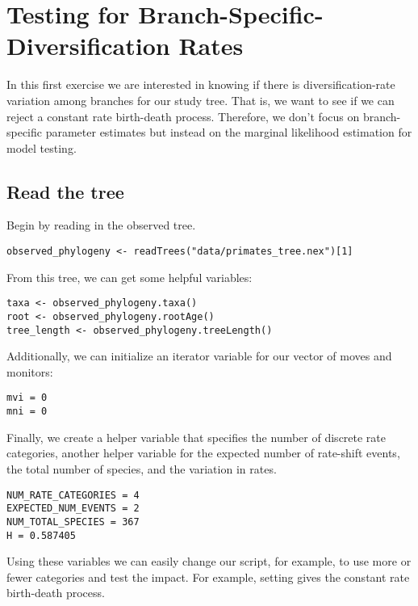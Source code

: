 \bigskip
\section{Testing for Branch-Specific-Diversification Rates}

In this first exercise we are interested in knowing if there is diversification-rate variation among branches for our study tree.
That is, we want to see if we can reject a constant rate birth-death process.
Therefore, we don't focus on branch-specific parameter estimates but instead on the marginal likelihood estimation for model testing.



\subsection{Read the tree}

Begin by reading in the observed tree.

{\tt \begin{snugshade*}
\begin{lstlisting}
observed_phylogeny <- readTrees("data/primates_tree.nex")[1]
\end{lstlisting}
\end{snugshade*}}

From this tree, we can get some helpful variables:
{\tt \begin{snugshade*}
\begin{lstlisting}
taxa <- observed_phylogeny.taxa()
root <- observed_phylogeny.rootAge()
tree_length <- observed_phylogeny.treeLength()
\end{lstlisting}
\end{snugshade*}}

Additionally, we can initialize an iterator variable for our vector of moves and monitors:
{\tt \begin{snugshade*}
\begin{lstlisting}
mvi = 0
mni = 0
\end{lstlisting}
\end{snugshade*}}

Finally, we create a helper variable that specifies the number of discrete rate categories, another helper variable for the expected number of rate-shift events, the total number of species, and the variation in rates.
{\tt \begin{snugshade*}
\begin{lstlisting}
NUM_RATE_CATEGORIES = 4
EXPECTED_NUM_EVENTS = 2
NUM_TOTAL_SPECIES = 367
H = 0.587405
\end{lstlisting}
\end{snugshade*}}
Using these variables we can easily change our script, for example, to use more or fewer categories and test the impact.
For example, setting  gives the constant rate birth-death process.

